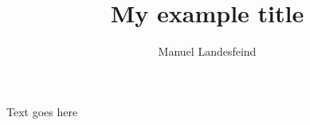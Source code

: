 \documentclass{article}
\title{My example title}
\author{Manuel Landesfeind}
\begin{document}
\maketitle

Text goes here
\end{document}
